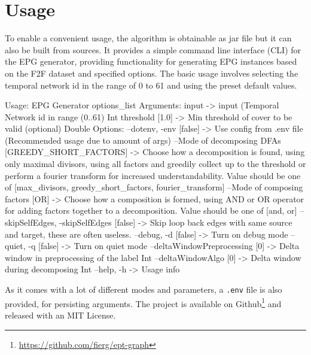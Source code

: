 \section{Usage}
\label{ch:Implementation:usage}
To enable a convenient usage, the algorithm is obtainable as jar file but it can also be built from sources.
It provides a simple command line interface (CLI) for the EPG generator, providing functionality for generating EPG instances based on the F2F dataset and specified options.
The basic usage involves selecting the temporal network id in the range of 0 to 61 and using the preset default values.

\begin{verbnobox}[\fontsize{10.5pt}{10.5pt}\selectfont]
Usage: EPG Generator options_list
Arguments: 
input -> input (Temporal Network id in range (0..61) { Int }
threshold [1.0] -> Min threshold of cover to be valid (optional) { Double }
Options: 
--dotenv, -env [false] -> Use config from .env file
		(Recommended usage due to amount of args) 
--Mode of decomposing DFAs [GREEDY_SHORT_FACTORS] -> Choose how
		a decomposition is found, using only maximal divisors,
		using all factors and greedily collect up to the threshold
		or perform a fourier transform for increased understandability.
		{ Value should be one of [max_divisors, greedy_short_factors,
 		fourier_transform] }
--Mode of composing factors [OR] -> Choose how a composition is formed,
		using AND or OR operator for adding factors together to
		a decomposition. { Value should be one of [and, or] }
--skipSelfEdges, -skipSelfEdges [false] -> Skip loop back edges
		with same source and target, these are often useless. 
--debug, -d [false] -> Turn on debug mode 
--quiet, -q [false] -> Turn on quiet mode 
--deltaWindowPreprocessing [0] -> Delta window
		 in preprocessing of the label { Int }
--deltaWindowAlgo [0] -> Delta window during decomposing { Int }
--help, -h -> Usage info 
\end{verbnobox}
As it comes with a lot of different modes and parameters, a \verb*|.env| file is also provided, for persisting arguments.
The project is available on Github\footnote{\url{https://github.com/fierg/ept-graph}} and released with an MIT License.
